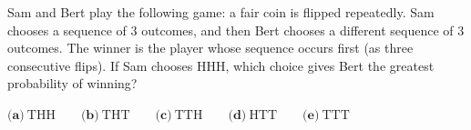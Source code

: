 Sam and Bert play the following game: a fair coin is flipped repeatedly. Sam chooses a sequence of $3$ outcomes, and then Bert chooses a different sequence of $3$ outcomes. The winner is the player whose sequence occurs first (as three consecutive flips). If Sam chooses HHH, which choice gives Bert the greatest probability of winning?

$\textbf{(a)}\ \text{THH}\qquad\textbf{(b)}\ \text{THT}\qquad\textbf{(c)}\ \text{TTH}\qquad\textbf{(d)}\ \text{HTT}\qquad\textbf{(e)}\ \text{TTT}$

